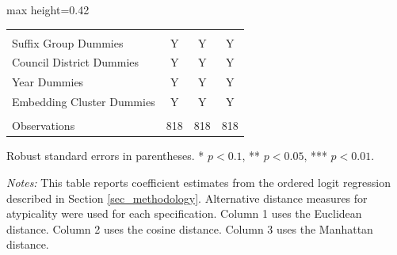 \begin{table}[H]
\begin{adjustbox}{max height=0.42\textheight}
\begin{threeparttable}
\begin{tabular}{lccc}
 & & & \\ 
Suffix Group Dummies  & Y  & Y  & Y  \\ 
Council District Dummies  & Y  & Y  & Y  \\ 
Year Dummies  & Y  & Y  & Y  \\ 
Embedding Cluster Dummies  & Y  & Y  & Y  \\ 

 & & & \\ 
Observations  & 818 & 818 & 818 \\ [1.8ex]
\bottomrule
\end{tabular}
\begin{tablenotes}[flushleft]
\footnotesize
\item Robust standard errors in parentheses. * $p<0.1$, ** $p<0.05$, *** $p<0.01$.
\item \textit{Notes:} This table reports coefficient estimates from the ordered logit regression described in Section \ref{sec_methodology}. Alternative distance measures for atypicality were used for each specification. Column 1 uses the Euclidean distance. Column 2 uses the cosine distance. Column 3 uses the Manhattan distance.
\end{tablenotes}
\end{threeparttable}
\end{adjustbox}
\end{table}
